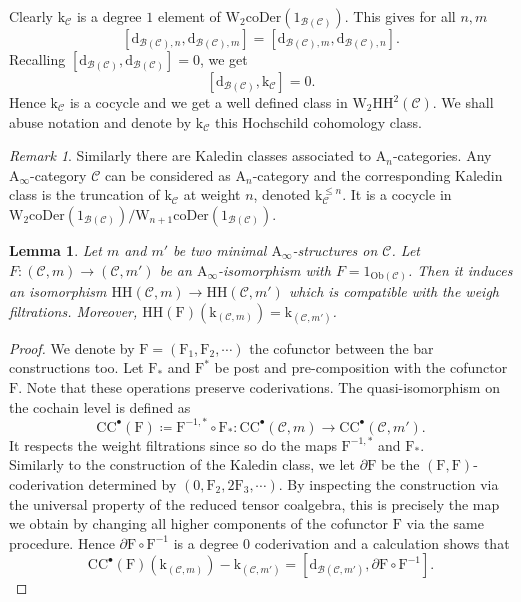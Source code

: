 \documentclass{article}
\theoremstyle{plain}
\newtheorem{lemma}[theorem]{Lemma}
\theoremstyle{definition}
\theoremstyle{remark}
\newtheorem{remark}[theorem]{Remark}
\newcommand{\mr}{\mathrm}
\newcommand{\Aa}{\mr{A}_{\infty}}
\newcommand{\Cc}{\mathcal C}
\newcommand{\3}{\vspace{3mm}}
\newcommand{\2}{\vspace{2mm}}
\newcommand{\1}{\vspace{1mm}}
\begin{document}
Clearly $\mr{k}_\mathcal{C}$ is a degree $1$ element of $\mr{W}_2\mr{coDer}\left(1_{\mathcal{B}(\mathcal{C})}\right)$. This gives for all $n,m$ $$[\mr{d}_{\mathcal{B}(\mathcal{C}),n},\mr{d}_{\mathcal{B}(\mathcal{C}),m}]=[\mr{d}_{\mathcal{B}(\mathcal{C}),m},\mr{d}_{\mathcal{B}(\mathcal{C}),n}].$$ Recalling $[\mr{d}_{\mathcal{B}(\mathcal{C})},\mr{d}_{\mathcal{B}(\mathcal{C})}]=0$, we get $$[\mr{d}_{\mathcal{B}(\mathcal{C})},\mr{k}_\mathcal{C}]=0.$$
Hence $\mr{k}_\mathcal{C}$ is a cocycle and we get a well defined class in $\mr{W}_2\mr{HH}^{2}(\mathcal{C})$. We shall abuse notation and denote by $\mr{k}_\Cc$ this Hochschild cohomology class.
\2
\begin{remark}
Similarly there are Kaledin classes associated to $\mr{A}_n$-categories. Any $\Aa$-category $\mathcal{C}$ can be considered as $\mr{A}_n$-category and the corresponding Kaledin class is the truncation of $\mr{k}_\mathcal{C}$ at weight $n$, denoted $\mr{k}_\mathcal{C}^{\le n}$. It is a cocycle in $\mr{W}_2\mr{coDer}(1_{\mathcal{B}(\mathcal{C})})/\mr{W}_{n+1}\mr{coDer}(1_{\mathcal{B}(\mathcal{C})})$.
\end{remark}
\2
\begin{lemma}
Let $m$ and $m'$ be two minimal $\Aa$-structures on $\Cc$. Let $F:(\Cc,m)\to (\Cc,m')$ be an $\Aa$-isomorphism with $F=1_{\mr{Ob}(\Cc)}$. Then it induces an isomorphism $\mr{HH}(\Cc,m)\to \mr{HH}(\Cc,m')$ which is compatible with the weigh filtrations. Moreover, $\mr{HH}(\mr{F})\left(\mr{k}_{(\Cc,m)}\right)=\mr{k}_{(\Cc,m')}$.
\end{lemma}
\begin{proof}
We denote by $\mr{F}=(\mr{F}_1,\mr{F}_2,\cdots)$ the cofunctor between the bar constructions too. Let $\mr{F}_*$ and $\mr{F}^*$ be post and pre-composition with the cofunctor $\mr{F}$. Note that these operations preserve coderivations. The quasi-isomorphism on the cochain level is defined as $$\mr{CC}^\bullet(\mr{F})\coloneqq\mr{F}^{-1,*}\circ \mr{F}_*:\mr{CC}^\bullet(\Cc,m)\to \mr{CC}^\bullet(\Cc,m').$$ It respects the weight filtrations since so do the maps $\mr{F}^{-1,*}$ and $\mr{F}_*$.\\ Similarly to the construction of the Kaledin class, we let $\partial\mr{F}$ be the $(\mr{F,F})$-coderivation determined by $(0,\mr{F}_2,2\mr{F}_3,\cdots)$. By inspecting the construction via the universal property of the reduced tensor coalgebra, this is precisely the map we obtain by changing all higher components of the cofunctor $\mr{F}$ via the same procedure. Hence $\partial\mr{F}\circ \mr{F}^{-1}$ is a degree $0$ coderivation and a calculation shows that $$\mr{CC}^\bullet(\mr{F})\left(\mr{k}_{(\Cc,m)}\right)-\mr{k}_{(\Cc,m')}=[\mr{d}_{\mathcal{B}(\Cc,m')},\partial\mr{F}\circ \mr{F}^{-1}].$$
\end{proof}
\end{document}
